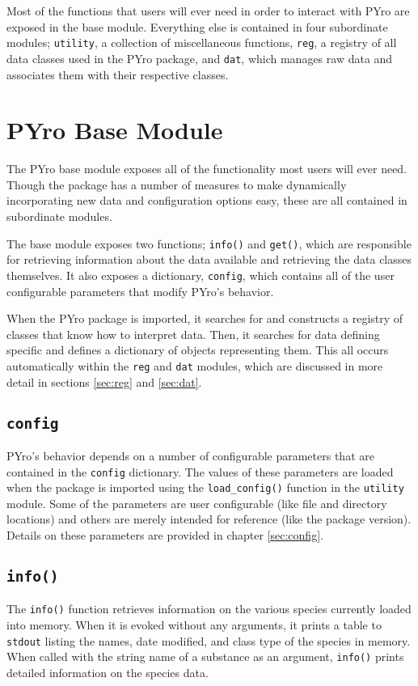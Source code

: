 Most of the functions that users will ever need in order to interact with PYro are exposed in the base module.  Everything else is contained in four subordinate modules; \verb|utility|, a collection of miscellaneous functions, \verb|reg|, a registry of all data classes used in the PYro package, and \verb|dat|, which manages raw data and associates them with their respective classes.


\section{PYro Base Module}
The PYro base module exposes all of the functionality most users will ever need.  Though the package has a number of measures to make dynamically incorporating new data and configuration options easy, these are all contained in subordinate modules.

The base module exposes two functions; \verb|info()| and \verb|get()|, which are responsible for retrieving information about the data available and retrieving the data classes themselves.  It also exposes a dictionary, \verb|config|, which contains all of the user configurable parameters that modify PYro's behavior.

When the PYro package is imported, it searches for and constructs a registry of classes that know how to interpret data.  Then, it searches for data defining specific and defines a dictionary of objects representing them.  This all occurs automatically within the \verb|reg| and \verb|dat| modules, which are discussed in more detail in sections \ref{sec:reg} and \ref{sec:dat}.

\subsection{\texttt{config}}
PYro's behavior depends on a number of configurable parameters that are contained in the \verb|config| dictionary.  The values of these parameters are loaded when the package is imported using the \verb|load_config()| function in the \verb|utility| module.  Some of the parameters are user configurable (like file and directory locations) and others are merely intended for reference (like the package version).  Details on these parameters are provided in chapter \ref{sec:config}.

\subsection{\texttt{info()}}
The \verb|info()| function retrieves information on the various species currently loaded into memory.  When it is evoked without any arguments, it prints a table to \verb|stdout| listing the names, date modified, and class type of the species in memory.  When called with the string name of a substance as an argument, \verb|info()| prints detailed information on the species data.


